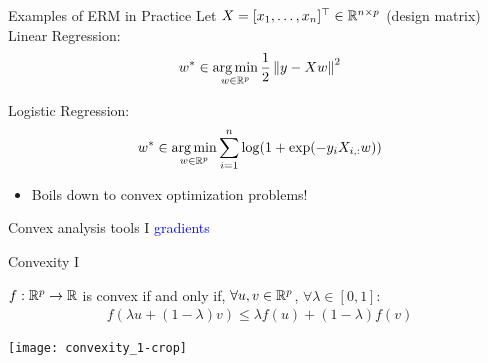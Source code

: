 \begin{frame}{Examples of ERM in Practice}
Let $X = [x_1, \dots, x_n]^\top \in \mathbb{R}^{n \times p}$ (design matrix)\\
\medskip
%
Linear Regression:
%
\begin{align*}
    w^*
    \in 
    \mathop{\mathrm{arg\,min}}_{w \in \mathbb{R}^p}
    \frac{1}{2} \left\lVert {y - Xw} \right\rVert^2
\end{align*}
%
\pause 

Logistic Regression:
%
\begin{align*}
    w^*
    \in 
    \mathop{\mathrm{arg\,min}}_{w \in \mathbb{R}^p}
    \sum_{i=1}^{n} \log(1 + \exp(- y_i X_{i, :} w))
\end{align*}

\pause 

\begin{itemize}
    \item Boils down to convex optimization problems!
\end{itemize}
\end{frame}

\begin{frame}{Convex analysis tools I}
    \textcolor{blue}{gradients}
\end{frame}


\begin{frame}{Convexity I}
    \begin{definition}
    $f: \mathbb{R}^p \rightarrow \mathbb{R}$ is convex if and only if, $ \forall u, v \in \mathbb{R}^p$, $ \forall \lambda \in [0, 1]$:
    \begin{align*}
        f(\lambda u + (1 - \lambda) v)
        \leq 
        \lambda f(u) + (1 - \lambda) f(v)
    \end{align*}
    \end{definition}
    
    \centering
    \texttt{[image: convexity\_1-crop]}


\end{frame}


